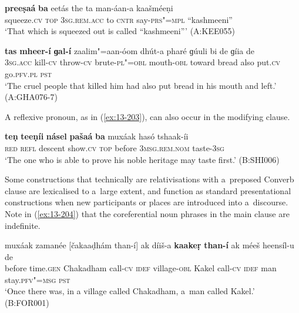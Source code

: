 \begin{exe}
\ex
\label{ex:13-201}
\gll \textbf{preeṣaá} \textbf{ba} eetás the ta man-áan-a kaašméeṇi \\
squeeze.\textsc{cv} \textsc{top} \textsc{3sg.rem.acc} to \textsc{cntr} say-\textsc{prs"=mpl} ``kashmeeni'' \\
\glt `That which is squeezed out is called ``kashmeeni''' (A:KEE055)

\ex
\label{ex:13-202}
\gll \textbf{tas} \textbf{mheer-í} \textbf{ɡal-í} zaalim"=aan-óom dhút-a  pharé ɡúuli bi de ɡíia de \\
\textsc{3sg.acc} kill-\textsc{cv} throw-\textsc{cv} brute-\textsc{pl"=obl} mouth-\textsc{obl}  toward bread also put.\textsc{cv} go.\textsc{pfv.pl} \textsc{pst} \\
\glt `The cruel people that killed him had also put bread in his mouth and left.' (A:GHA076-7) 
\end{exe}

A reflexive pronoun, as in (\ref{ex:13-203}), can also occur in the modifying clause. 

\begin{exe}
\ex
\label{ex:13-203}
\gll \textbf{teṇ} \textbf{teeṇíi} \textbf{násel} \textbf{pašaá} \textbf{ba} muxáak hasó  tshaak-íi \\
\textsc{red} \textsc{refl} descent show.\textsc{cv} \textsc{top} before \textsc{3msg.rem.nom}  taste-\textsc{3sg} \\
\glt `The one who is able to prove his noble heritage may taste first.' (B:SHI006) 
\end{exe}

Some constructions that technically are relativisations with a~preposed Converb clause are lexicalised to a~large extent, and function as standard presentational constructions when new participants or places are introduced into a~discourse. Note in (\ref{ex:13-204}) that the coreferential noun phrases in the main clause are indefinite.

\begin{exe}
\ex
\label{ex:13-204}
\gll muxáak zamanée [čakaaḍhám than-í] ak díiš-a  \textbf{kaakeṛ} \textbf{than-í} ak méeš heensíl-u de  \\
before time.\textsc{gen} Chakadham call-\textsc{cv} \textsc{idef} village-\textsc{obl}  Kakel call-\textsc{cv} \textsc{idef} man stay.\textsc{pfv"=msg} \textsc{pst} \\
\glt `Once there was, in a village called Chakadham, a~man called Kakel.' (B:FOR001)
\end{exe}


